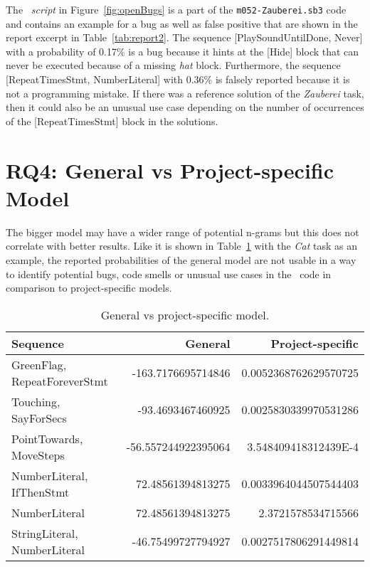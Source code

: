 The \scratch\ \textit{script} in Figure~\ref{fig:openBugs} is a part of the \texttt{m052-Zauberei.sb3} code and contains an example for a bug as well as false positive that are shown in the report excerpt in Table~\ref{tab:report2}. The sequence [PlaySoundUntilDone, Never] with a probability of 0.17\% is a bug because it hints at the [Hide] block that can never be executed because of a missing \textit{hat} block. Furthermore, the sequence [RepeatTimesStmt, NumberLiteral] with 0.36\% is falsely reported because it is not a programming mistake. If there was a reference solution of the \textit{Zauberei} task, then it could also be an unusual use case depending on the number of occurrences of the [RepeatTimesStmt] block in the solutions.


\section{RQ4: General vs Project-specific Model}\label{sec:project-specific}
The bigger model may have a wider range of potential n-grams but this does not correlate with better results. Like it is shown in Table~\ref{tab:versus} with the \textit{Cat} task as an example, the reported probabilities of the general model are not usable in a way to identify potential bugs, code smells or unusual use cases in the \scratch\ code in comparison to project-specific models. 

\begin{table}[hbtp]
    \centering
    \caption[General vs project-specific model]{\label{tab:versus}General vs project-specific model.}
    \begin{tabular}{lrr}
        \toprule
        Sequence & General & Project-specific \\
        \midrule
        GreenFlag, RepeatForeverStmt & -163.7176695714846 & 0.0052368762629570725 \\
        Touching, SayForSecs & -93.4693467460925 & 0.0025830339970531286 \\
        PointTowards, MoveSteps & -56.557244922395064 & 3.548409418312439E-4 \\
        NumberLiteral, IfThenStmt & 72.48561394813275 & 0.0033964044507544403 \\
        NumberLiteral & 72.48561394813275 & 2.3721578534715566 \\
        StringLiteral, NumberLiteral & -46.75499727794927 & 0.0027517806291449814 \\
        \bottomrule
    \end{tabular}
\end{table}

